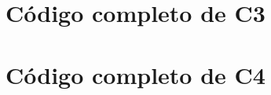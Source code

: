 \documentclass{upo-master}
\begin{document}


\section{Código completo de C3}\label{anexo:c3}



\section{Código completo de C4}\label{anexo:c4}


\end{document}
